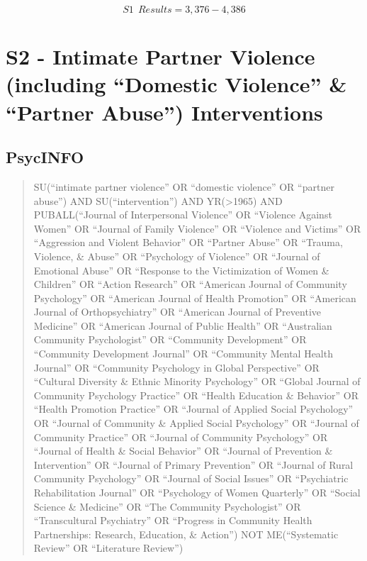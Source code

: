 \documentclass[]{tufte-handout}
\begin{document}
\[ S1~~Results = 3,376-4,386 \]

\newpage

\section{\texorpdfstring{S2 - Intimate Partner Violence (including
``Domestic Violence'' \& ``Partner Abuse'')
Interventions}{S2 - Intimate Partner Violence (including Domestic Violence \& Partner Abuse) Interventions}}\label{s2---intimate-partner-violence-including-domestic-violence-partner-abuse-interventions}

\subsection{PsycINFO}\label{psycinfo-1}

\begin{quote}
SU(``intimate partner violence'' OR ``domestic violence'' OR ``partner
abuse'') AND SU(``intervention'') AND YR(\textgreater{}1965) AND
PUBALL(``Journal of Interpersonal Violence'' OR ``Violence Against
Women'' OR ``Journal of Family Violence'' OR ``Violence and Victims'' OR
``Aggression and Violent Behavior'' OR ``Partner Abuse'' OR ``Trauma,
Violence, \& Abuse'' OR ``Psychology of Violence'' OR ``Journal of
Emotional Abuse'' OR ``Response to the Victimization of Women \&
Children'' OR ``Action Research'' OR ``American Journal of Community
Psychology'' OR ``American Journal of Health Promotion'' OR ``American
Journal of Orthopsychiatry'' OR ``American Journal of Preventive
Medicine'' OR ``American Journal of Public Health'' OR ``Australian
Community Psychologist'' OR ``Community Development'' OR ``Community
Development Journal'' OR ``Community Mental Health Journal'' OR
``Community Psychology in Global Perspective'' OR ``Cultural Diversity
\& Ethnic Minority Psychology'' OR ``Global Journal of Community
Psychology Practice'' OR ``Health Education \& Behavior'' OR ``Health
Promotion Practice'' OR ``Journal of Applied Social Psychology'' OR
``Journal of Community \& Applied Social Psychology'' OR ``Journal of
Community Practice'' OR ``Journal of Community Psychology'' OR ``Journal
of Health \& Social Behavior'' OR ``Journal of Prevention \&
Intervention'' OR ``Journal of Primary Prevention'' OR ``Journal of
Rural Community Psychology'' OR ``Journal of Social Issues'' OR
``Psychiatric Rehabilitation Journal'' OR ``Psychology of Women
Quarterly'' OR ``Social Science \& Medicine'' OR ``The Community
Psychologist'' OR ``Transcultural Psychiatry'' OR ``Progress in
Community Health Partnerships: Research, Education, \& Action'') NOT
ME(``Systematic Review'' OR ``Literature Review'')
\end{quote}
\end{document}
